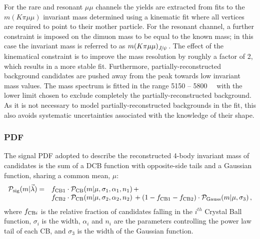 For the rare and resonant $\mu\mu$ channels the yields are extracted from fits to the $m(K\pi \mu\mu)$ invariant mass 
determined using a kinematic fit where all vertices are required to point to their mother particle.
For the resonant channel, a further constraint is imposed on the dimuon mass to be equal to the known \jpsi mass;
in this case the invariant mass is referred to as $m(K\pi \mu\mu)_\jpsi$.
The effect of the kinematical constraint is to improve the mass resolution by roughly a factor of 2, which results
in a more stable fit. Furthermore, partially-reconstructed  background candidates are pushed away from
the \Bz peak towards low invariant mass values. %
The mass spectrum is fitted in the range 5150 -- 5800~\mevcc~ with the lower limit
chosen to exclude completely the partially-reconstructed  background.
As it is not necessary to model partially-reconstructed  backgrounds in the fit, this also avoids
systematic uncertainties associated with the knowledge of their shape. 

\subsubsection{\BdToKstJPsmm PDF}

The signal PDF adopted to describe the reconstructed 4-body invariant mass of \BdToKstJPsmm candidates is the 
sum of a DCB function with opposite-side tails and a Gaussian function, sharing a common mean, $\mu$:
%
\begin{equation*}
\begin{array}{rl}
\mathcal{P}_{\rm sig}(m | \vec{\lambda}) = & 
f_{\rm CB1} \cdot \mathcal{P}_{\rm CB}(m | \mu, \sigma_1, \alpha_1, n_1) \, + \\
& f_{\rm CB2} \cdot \mathcal{P}_{\rm CB}(m | \mu, \sigma_2, \alpha_2, n_2) \, 
+ (1 - f_{\rm CB1} -f_{\rm CB2}) \cdot \mathcal{P}_{\rm Gauss}(m | \mu, \sigma_3) \, ,
\end{array}
\end{equation*}
where $f_{{\rm CB}i}$ is the relative fraction of candidates falling in the $i^{th}$ Crystal Ball function, $\sigma_i$ 
is the width, $\alpha_i$ and $n_i$ are the parameters controlling the power law tail of each CB, and $\sigma_3$ 
is the width of the Gaussian function.

